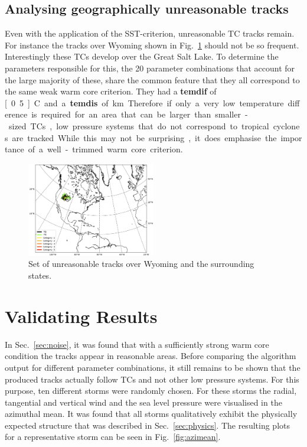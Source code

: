 \subsection*{Analysing geographically unreasonable tracks}
Even with the application of the SST-criterion, unreasonable TC tracks remain. For instance the tracks over Wyoming shown in Fig.~\ref{fig:rogue-tracks} should not be so frequent. Interestingly these TCs develop over the Great Salt Lake. To determine the parameters responsible for this, the 20 parameter combinations that account for the large majority of these, share the common feature that they all correspond to the same weak warm core criterion. They had a \textbf{temdif} of \unit[0.5]{\degree C} and a \textbf{temdis} of \unit[400]{km}. Therefore if only a very low temperature difference is required for an area that can be larger than smaller-sized TCs, low pressure systems that do not correspond to tropical cyclones are tracked. While this may not be surprising, it does emphasise the importance of a well-trimmed warm core criterion.
\begin{figure}[!htb]
	\centering
	\includegraphics[width=0.5\textwidth]{img/rogue_tracks.png}
	\caption{Set of unreasonable tracks over Wyoming and the surrounding states.}
	\label{fig:rogue-tracks}
\end{figure}
\section{Validating Results}
In Sec.~\ref{sec:noise}, it was found that with a sufficiently strong warm core condition the tracks appear in reasonable areas. Before comparing the algorithm output for different parameter combinations, it still remains to be shown that the produced tracks actually follow TCs and not other low pressure systems. For this purpose, ten different storms were randomly chosen. For these storms the radial, tangential and vertical wind and the sea level pressure were visualised in the azimuthal mean. It was found that all storms qualitatively exhibit the physically expected structure that was described in Sec.~\ref{sec:physics}. The resulting plots for a representative storm can be seen in Fig.~\ref{fig:azimean}.

